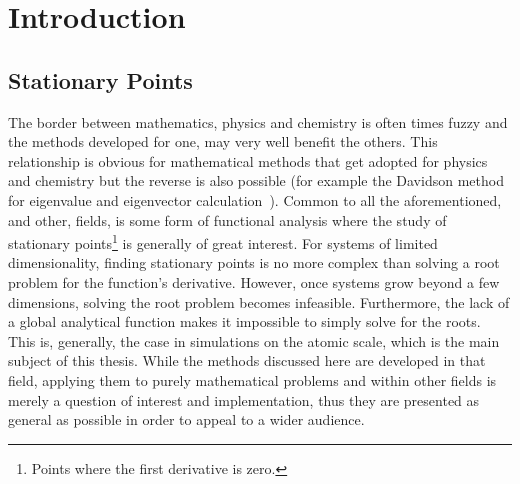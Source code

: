 \chapter{Introduction}
\label{chap:introduction}


\section{Stationary Points}
The border between mathematics, physics and chemistry is often times fuzzy and the methods developed for one, may very well benefit the others.
This relationship is obvious for mathematical methods that get adopted for physics and chemistry but the reverse is also possible (for example the Davidson method for eigenvalue and eigenvector calculation~\cite{davidson-method-1975}).
Common to all the aforementioned, and other, fields, is some form of functional analysis where the study of stationary points\footnote{Points where the first derivative is zero.} is generally of great interest.
For systems of limited dimensionality, finding stationary points is no more complex than solving a root problem for the function's derivative.
However, once systems grow beyond a few dimensions, solving the root problem becomes infeasible.
Furthermore, the lack of a global analytical function makes it impossible to simply solve for the roots.
This is, generally, the case in simulations on the atomic scale, which is the main subject of this thesis.
While the methods discussed here are developed in that field, applying them to purely mathematical problems and within other fields is merely a question of interest and implementation, thus they are presented as general as possible in order to appeal to a wider audience.

